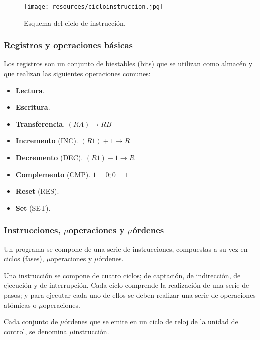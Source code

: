 \documentclass[a4paper, 11pt, titlepage]{article}
\begin{document}
        \begin{figure}[htp]
            \centering
            \texttt{[image: resources/cicloinstruccion.jpg]}
            \caption{Esquema del ciclo de instrucción.}
            \label{cicloinstruccion}
        \end{figure}

        \subsubsection{Registros y operaciones básicas}

            Los registros son un conjunto de biestables (bits) que se utilizan como almacén y que realizan las
            siguientes operaciones comunes:

            \begin{itemize}
                \item \textbf{Lectura}.
                \item \textbf{Escritura}.
                \item \textbf{Transferencia}. $(RA)\rightarrow RB$
                \item \textbf{Incremento} (INC). $(R1) + 1 \rightarrow R$
                \item \textbf{Decremento} (DEC). $(R1)-1 \rightarrow R$
                \item \textbf{Complemento} (CMP). $1 = 0; 0=1$
                \item \textbf{Reset} (RES).
                \item \textbf{Set} (SET).
            \end{itemize}

        \subsubsection{Instrucciones, $\mu$operaciones y $\mu$órdenes}

            Un programa se compone de una serie de instrucciones, compuestas a su vez en ciclos (fases),
            $\mu$operaciones y $\mu$órdenes.

            Una instrucción se compone de cuatro ciclos; de captación, de indirección, de ejecución y 
            de interrupción. Cada ciclo comprende la realización de una serie de pasos; y para ejecutar 
            cada uno de ellos se deben realizar una serie de operaciones atómicas o $\mu$operaciones.

            Cada conjunto de $\mu$órdenes que se emite en un ciclo de reloj de la unidad de control, se 
            denomina $\mu$instrucción.
\end{document}
